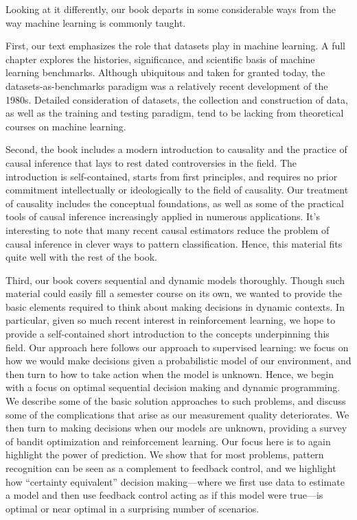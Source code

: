 \documentclass{tufte-book}
\begin{document}
Looking at it differently, our book departs in some considerable ways
from the way machine learning is commonly taught.

First, our text emphasizes the role that datasets play in machine
learning. A full chapter explores the histories, significance, and
scientific basis of machine learning benchmarks. Although ubiquitous and
taken for granted today, the datasets-as-benchmarks paradigm was a
relatively recent development of the 1980s. Detailed consideration of
datasets, the collection and construction of data, as well as the
training and testing paradigm, tend to be lacking from theoretical
courses on machine learning.

Second, the book includes a modern introduction to causality and the
practice of causal inference that lays to rest dated controversies in
the field. The introduction is self-contained, starts from first
principles, and requires no prior commitment intellectually or
ideologically to the field of causality. Our treatment of causality
includes the conceptual foundations, as well as some of the practical
tools of causal inference increasingly applied in numerous applications.
It's interesting to note that many recent causal estimators reduce the
problem of causal inference in clever ways to pattern classification.
Hence, this material fits quite well with the rest of the book.

Third, our book covers sequential and dynamic models thoroughly. Though
such material could easily fill a semester course on its own, we wanted
to provide the basic elements required to think about making decisions
in dynamic contexts. In particular, given so much recent interest in
reinforcement learning, we hope to provide a self-contained short
introduction to the concepts underpinning this field. Our approach here
follows our approach to supervised learning: we focus on how we would
make decisions given a probabilistic model of our environment, and then
turn to how to take action when the model is unknown. Hence, we begin
with a focus on optimal sequential decision making and dynamic
programming. We describe some of the basic solution approaches to such
problems, and discuss some of the complications that arise as our
measurement quality deteriorates. We then turn to making decisions when
our models are unknown, providing a survey of bandit optimization and
reinforcement learning. Our focus here is to again highlight the power
of prediction. We show that for most problems, pattern recognition can
be seen as a complement to feedback control, and we highlight how
``certainty equivalent'' decision making---where we first use data to
estimate a model and then use feedback control acting as if this model
were true---is optimal or near optimal in a surprising number of
scenarios.
\end{document}
